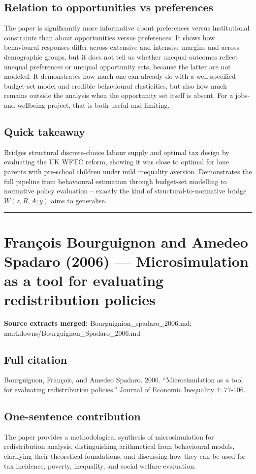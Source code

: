 \documentclass[11pt,a4paper]{article}
\begin{document}
\subsection*{Relation to opportunities vs preferences}
The paper is significantly more informative about preferences versus institutional constraints than about opportunities versus preferences. It shows how behavioural responses differ across extensive and intensive margins and across demographic groups, but it does not tell us whether unequal outcomes reflect unequal preferences or unequal opportunity sets, because the latter are not modeled. It demonstrates how much one can already do with a well-specified budget-set model and credible behavioural elasticities, but also how much remains outside the analysis when the opportunity set itself is absent. For a jobs-and-wellbeing project, that is both useful and limiting.

\subsection*{Quick takeaway}
Bridges structural discrete-choice labour supply and optimal tax design by evaluating the UK WFTC reform, showing it was close to optimal for lone parents with pre-school children under mild inequality aversion. Demonstrates the full pipeline from behavioural estimation through budget-set modelling to normative policy evaluation -- exactly the kind of structural-to-normative bridge $W(z,R,A;y)$ aims to generalise.


\medskip\hrule\medskip

\section*{François Bourguignon and Amedeo Spadaro (2006) — Microsimulation as a tool for evaluating redistribution policies}

\textbf{Source extracts merged:} Bourguignion\_spadaro\_2006.md; markdowns/Bourguignon\_Spadaro\_2006.md

\subsection*{Full citation}
Bourguignon, François, and Amedeo Spadaro. 2006. “Microsimulation as a tool for evaluating redistribution policies.” Journal of Economic Inequality 4: 77-106.

\subsection*{One-sentence contribution}
The paper provides a methodological synthesis of microsimulation for redistribution analysis, distinguishing arithmetical from behavioural models, clarifying their theoretical foundations, and discussing how they can be used for tax incidence, poverty, inequality, and social welfare evaluation.
\end{document}
